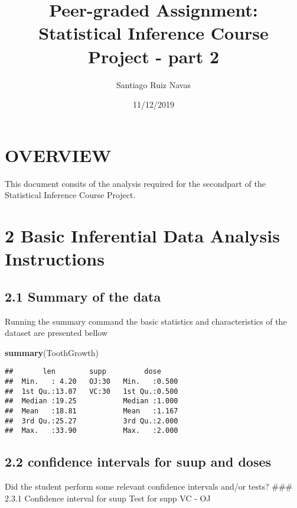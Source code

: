 \documentclass[]{article}
\title{Peer-graded Assignment: Statistical Inference Course Project - part 2}
\author{Santiago Ruiz Navas}
\date{11/12/2019}
\newenvironment{Shaded}{\begin{snugshade}}{\end{snugshade}}
\newcommand{\KeywordTok}[1]{\textcolor[rgb]{0.13,0.29,0.53}{\textbf{#1}}}
\newcommand{\NormalTok}[1]{#1}
\begin{document}
\maketitle

\hypertarget{overview}{%
\section{OVERVIEW}\label{overview}}

This document consits of the analysis required for the secondpart of the
Statistical Inference Course Project.

\hypertarget{basic-inferential-data-analysis-instructions}{%
\section{2 Basic Inferential Data Analysis
Instructions}\label{basic-inferential-data-analysis-instructions}}

\hypertarget{summary-of-the-data}{%
\subsection{2.1 Summary of the data}\label{summary-of-the-data}}

Running the summary command the basic statistics and characteristics of
the dataset are presented bellow

\begin{Shaded}
\begin{Highlighting}[]
\KeywordTok{summary}\NormalTok{(ToothGrowth)}
\end{Highlighting}
\end{Shaded}

\begin{verbatim}
##       len        supp         dose      
##  Min.   : 4.20   OJ:30   Min.   :0.500  
##  1st Qu.:13.07   VC:30   1st Qu.:0.500  
##  Median :19.25           Median :1.000  
##  Mean   :18.81           Mean   :1.167  
##  3rd Qu.:25.27           3rd Qu.:2.000  
##  Max.   :33.90           Max.   :2.000
\end{verbatim}

\hypertarget{confidence-intervals-for-suup-and-doses}{%
\subsection{2.2 confidence intervals for suup and
doses}\label{confidence-intervals-for-suup-and-doses}}

Did the student perform some relevant confidence intervals and/or tests?
\#\#\# 2.3.1 Confidence interval for suup Test for supp VC - OJ
\end{document}
